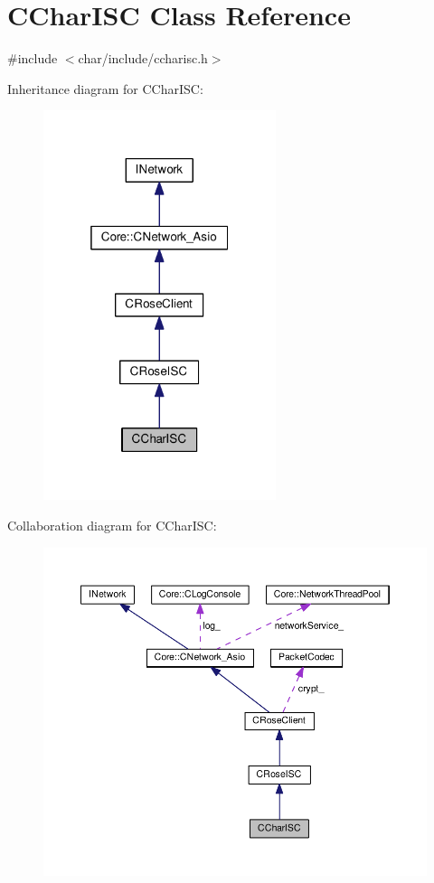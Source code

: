 \hypertarget{classCCharISC}{}\section{C\+Char\+I\+SC Class Reference}
\label{classCCharISC}


{\ttfamily \#include $<$char/include/ccharisc.\+h$>$}



Inheritance diagram for C\+Char\+I\+SC\+:
\nopagebreak
\begin{figure}[H]
\begin{center}
\leavevmode
\includegraphics[width=193pt]{classCCharISC__inherit__graph}
\end{center}
\end{figure}


Collaboration diagram for C\+Char\+I\+SC\+:
\nopagebreak
\begin{figure}[H]
\begin{center}
\leavevmode
\includegraphics[width=350pt]{classCCharISC__coll__graph}
\end{center}
\end{figure}
